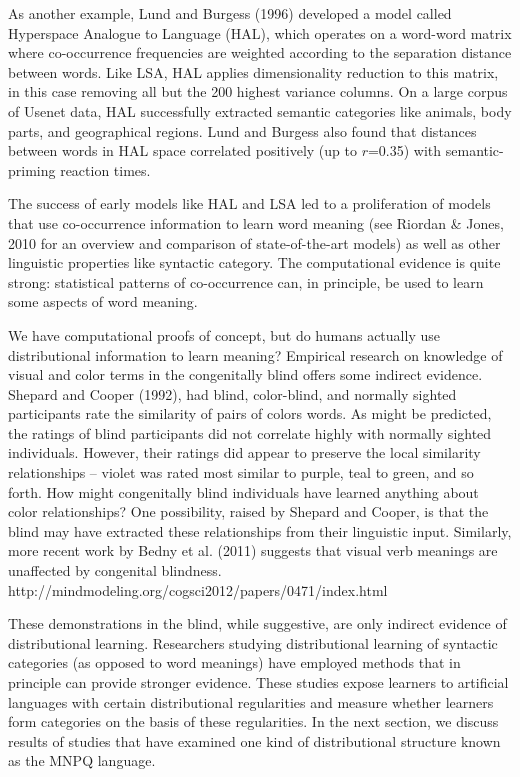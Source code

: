\documentclass[man,floatsintext]{apa6}
\begin{document}
As another example, Lund and Burgess (1996) developed a model called
Hyperspace Analogue to Language (HAL), which operates on a word-word
matrix where co-occurrence frequencies are weighted according to the
separation distance between words. Like LSA, HAL applies
dimensionality reduction to this matrix, in this case removing all but
the 200 highest variance columns. On a large corpus of Usenet data,
HAL successfully extracted semantic categories like animals, body
parts, and geographical regions. Lund and Burgess also found that
distances between words in HAL space correlated positively (up to
$r$=0.35) with semantic-priming reaction times.

The success of early models like HAL and LSA led to a proliferation of
models that use co-occurrence information to learn word meaning (see
Riordan \& Jones, 2010 for an overview and comparison of
state-of-the-art models) as well as other linguistic properties like
syntactic category. The computational evidence is quite strong:
statistical patterns of co-occurrence can, in principle, be used to
learn some aspects of word meaning.

We have computational proofs of concept, but do humans actually use
distributional information to learn meaning? Empirical research on
knowledge of visual and color terms in the congenitally blind offers
some indirect evidence. Shepard and Cooper (1992), had blind,
color-blind, and normally sighted participants rate the similarity of
pairs of colors words. As might be predicted, the ratings of blind
participants did not correlate highly with normally sighted
individuals. However, their ratings did appear to preserve the local
similarity relationships -- violet was rated most similar to purple,
teal to green, and so forth. How might congenitally blind individuals
have learned anything about color relationships? One possibility,
raised by Shepard and Cooper, is that the blind may have extracted
these relationships from their linguistic input. Similarly, more
recent work by Bedny et al. (2011) suggests that visual verb meanings
are unaffected by congenital blindness. %
http://mindmodeling.org/cogsci2012/papers/0471/index.html

These demonstrations in the blind, while suggestive, are only indirect
evidence of distributional learning. Researchers studying
distributional learning of syntactic categories (as opposed to word
meanings) have employed methods that in principle can provide stronger
evidence. These studies expose learners to artificial languages with
certain distributional regularities and measure whether learners form
categories on the basis of these regularities. In the next section, we
discuss results of studies that have examined one kind of
distributional structure known as the MNPQ language.
\end{document}
